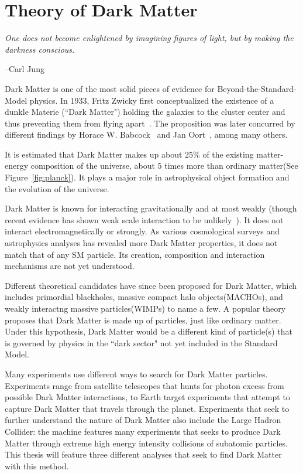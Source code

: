 \chapter{Theory of Dark Matter}
\label{chapter:DM}


\epigraph{\textit{One does not become enlightened by imagining figures of light, but by making the darkness conscious.}}{--Carl Jung}

Dark Matter is one of the most solid pieces of evidence for Beyond-the-Standard-Model physics. In 1933, Fritz Zwicky first conceptualized the existence of a dunkle Materie (``Dark Matter") holding the galaxies to the cluster center and thus preventing them from flying apart~\cite{Zwicky}. The proposition was later concurred by different findings by Horace W. Babcock~\cite{Babcock} and Jan Oort~\cite{oort}, among many others. 

It is estimated that Dark Matter makes up about 25\% of the existing matter-energy composition of the universe, about 5 times more than ordinary matter(See Figure~\ref{fig:planck}). It plays a major role in astrophysical object formation and the evolution of the universe. 

Dark Matter is known for interacting gravitationally and at most weakly (though recent evidence has shown weak scale interaction to be unlikely~\cite{DM2016}). It does not interact electromagnetically or strongly. As various cosmological surveys and astrophysics analyses has revealed more Dark Matter properties, it does not match that of any SM particle. Its creation, composition and interaction mechanisms are not yet understood.

Different theoretical candidates have since been proposed for Dark Matter, which includes primordial blackholes, massive compact halo objects(MACHOs), and weakly interactng massive particles(WIMPs) to name a few. A popular theory proposes that Dark Matter is made up of particles, just like ordinary matter. Under this hypothesis, Dark Matter would be a different kind of particle(s) that is governed by physics in the ``dark sector" not yet included in the Standard Model.

    Many experiments use different ways to search for Dark Matter particles. Experiments range from satellite telescopes that hunts for photon excess from possible Dark Matter interactions, to Earth target experiments that attempt to capture Dark Matter that travels through the planet. Experiments that seek to further understand the nature of Dark Matter also include the Large Hadron Collider: the machine features many experiments that seeks to produce Dark Matter through extreme high energy intensity collisions of subatomic particles. This thesis will feature three different analyses that seek to find Dark Matter with this method. 

